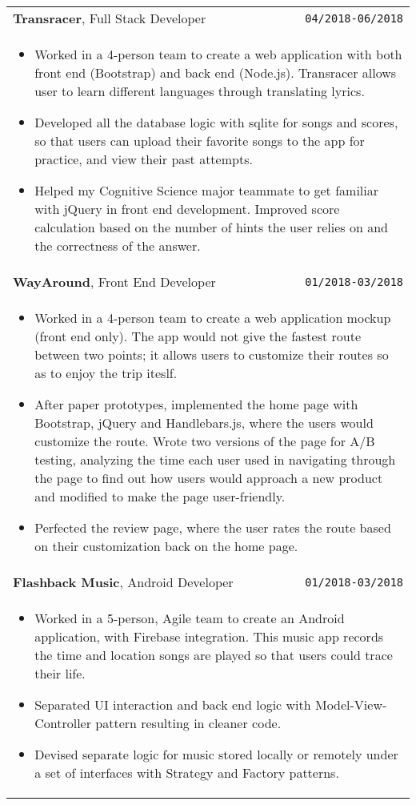 \documentclass[10pt, letterpaper]{article}
\begin{document}
\begin{tabularx}{\linewidth}{X r}
	\textbf{\large Transracer}, Full Stack Developer & \texttt{04/2018-06/2018} \\
	\multicolumn{2}{p{\linewidth}}{
		\begin{itemize}
			\item Worked in a 4-person team to create a web application with both front end (Bootstrap) and back end (Node.js). Transracer allows user to learn different languages through translating lyrics.
			\item Developed all the database logic with sqlite for songs and scores, so that users can upload their favorite songs to the app for practice, and view their past attempts.
			\item Helped my Cognitive Science major teammate to get familiar with jQuery in front end development. Improved score calculation based on the number of hints the user relies on and the correctness of the answer.
		\end{itemize}
	} \\
	
	\textbf{\large WayAround}, Front End Developer & \texttt{01/2018-03/2018} \\
	\multicolumn{2}{p{\linewidth}}{
		\begin{itemize}
			\item Worked in a 4-person team to create a web application mockup (front end only). The app would not give the fastest route between two points; it allows users to customize their routes so as to enjoy the trip iteslf.
			\item After paper prototypes, implemented the home page with Bootstrap, jQuery and Handlebars.js, where the users would customize the route. Wrote two versions of the page for A/B testing, analyzing the time each user used in navigating through the page to find out how users would approach a new product and modified to make the page user-friendly.
			\item Perfected the review page, where the user rates the route based on their customization back on the home page.
		\end{itemize}	
	} \\

	\textbf{\large Flashback Music}, Android Developer & \texttt{01/2018-03/2018} \\
	\multicolumn{2}{p{\linewidth}}{
		\begin{itemize}
			\item Worked in a 5-person, Agile team to create an Android application, with Firebase integration. This music app records the time and location songs are played so that users could trace their life.
			\item Separated UI interaction and back end logic with Model-View-Controller pattern resulting in cleaner code.
			\item Devised separate logic for music stored locally or remotely under a set of interfaces with Strategy and Factory patterns.
		\end{itemize}
	}
\end{tabularx}
\end{document}
